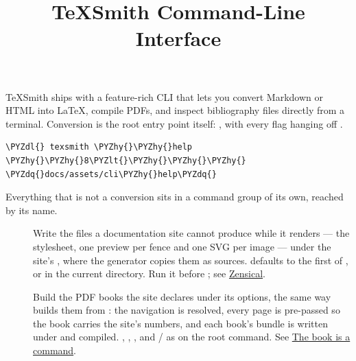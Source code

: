 \documentclass[a4paper,twoside]{article}
\title{TeXSmith Command-Line Interface}
\author{}\date{}
\begin{document}
\maketitle
TeXSmith ships with a feature-rich CLI that lets you convert Markdown or HTML into \LaTeX{}, compile PDFs, and inspect bibliography files directly from a terminal. Conversion is the root entry point itself: , with every flag hanging off .
\begin{tscode}[lang=text, engine=pygments]
\begin{Verbatim}[commandchars=\\\{\},breaklines, breakanywhere, commandchars=\\\{\}]
\PYZdl{} texsmith \PYZhy{}\PYZhy{}help
\PYZhy{}\PYZhy{}8\PYZlt{}\PYZhy{}\PYZhy{}\PYZhy{} \PYZdq{}docs/assets/cli\PYZhy{}help\PYZdq{}
\end{Verbatim}
\end{tscode}
Everything that is not a conversion sits in a command group of its own, reached by its name.
\begin{description}
\item[{}] Write the files a documentation site cannot produce while it renders --- the stylesheet, one preview per  fence and one SVG per  image --- under the site's , where the generator copies them as sources.  defaults to the first of ,  or  in the current directory. Run it before ; see \href{../guide/mkdocs.md\#zensical}{Zensical}.
\item[{}] Build the PDF books the site declares under its  options, the same way  builds them from : the navigation is resolved, every page is pre-passed so the book carries the site's numbers, and each book's bundle is written under  and compiled. , , , and  /  as on the root command. See \href{../guide/mkdocs.md\#the-book-is-a-command}{The book is a command}.
\end{description}
\end{document}
